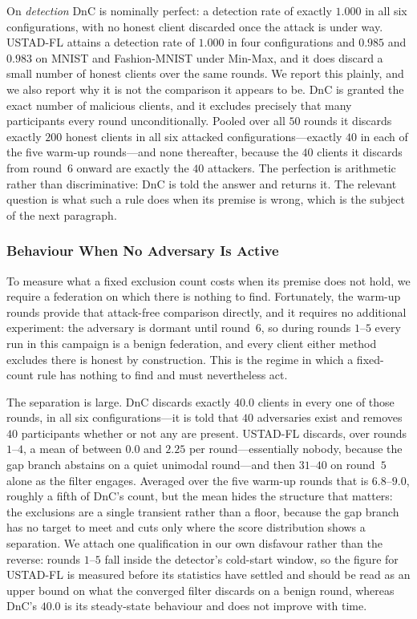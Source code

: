 \documentclass[journal]{IEEEtran}
\begin{document}
On \emph{detection} DnC is nominally perfect: a detection rate of exactly $1.000$ in all six configurations, with no honest client discarded once the attack is under way. USTAD-FL attains a detection rate of $1.000$ in four configurations and $0.985$ and $0.983$ on MNIST and Fashion-MNIST under Min-Max, and it does discard a small number of honest clients over the same rounds. We report this plainly, and we also report why it is not the comparison it appears to be. DnC is granted the exact number of malicious clients, and it excludes precisely that many participants every round unconditionally. Pooled over all $50$ rounds it discards exactly $200$ honest clients in all six attacked configurations---exactly $40$ in each of the five warm-up rounds---and none thereafter, because the $40$ clients it discards from round~$6$ onward are exactly the $40$ attackers. The perfection is arithmetic rather than discriminative: DnC is told the answer and returns it. The relevant question is what such a rule does when its premise is wrong, which is the subject of the next paragraph.

\subsubsection{Behaviour When No Adversary Is Active}
To measure what a fixed exclusion count costs when its premise does not hold, we require a
federation on which there is nothing to find. Fortunately, the warm-up rounds provide that
attack-free comparison directly, and it requires no additional experiment: the adversary is dormant until round~$6$, so during rounds $1$--$5$ every run in this campaign is a benign federation, and every client either method excludes there is honest by construction. This is the regime in which a fixed-count rule has nothing to find and must nevertheless act.

The separation is large. DnC discards exactly $40.0$ clients in every one of those rounds, in all six configurations---it is told that $40$ adversaries exist and removes $40$ participants whether or not any are present. USTAD-FL discards, over rounds $1$--$4$, a mean of between $0.0$ and $2.25$ per round---essentially nobody, because the gap branch abstains on a quiet unimodal round---and then $31$--$40$ on round~$5$ alone as the filter engages. Averaged over the five warm-up rounds that is $6.8$--$9.0$, roughly a fifth of DnC's count, but the mean hides the structure that matters: the exclusions are a single transient rather than a floor, because the gap branch has no target to meet and cuts only where the score distribution shows a separation. We attach one qualification in our own disfavour rather than the reverse: rounds $1$--$5$ fall inside the detector's cold-start window, so the figure for USTAD-FL is measured before its statistics have settled and should be read as an upper bound on what the converged filter discards on a benign round, whereas DnC's $40.0$ is its steady-state behaviour and does not improve with time.
\end{document}
